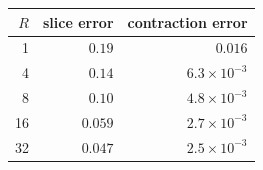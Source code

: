 \begin{tabular}{rrr}
\toprule
$R$ & slice error & contraction error \\ \midrule
1 & $0.19$ & $0.016$ \\
4 & $0.14$ & $6.3\times10^{-3}$ \\
8 & $0.10$ & $4.8\times10^{-3}$ \\
16 & $0.059$ & $2.7\times10^{-3}$ \\
32 & $0.047$ & $2.5\times10^{-3}$ \\
\bottomrule
\end{tabular}

